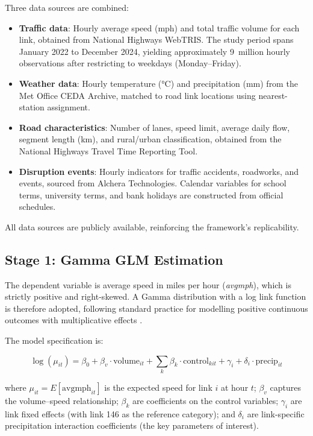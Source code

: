 \documentclass[review]{elsarticle}
\begin{document}
Three data sources are combined:

\begin{itemize}
    \item \textbf{Traffic data}: Hourly average speed (mph) and total traffic volume for each link, obtained from National Highways WebTRIS. The study period spans January 2022 to December 2024, yielding approximately 9~million hourly observations after restricting to weekdays (Monday--Friday).
    \item \textbf{Weather data}: Hourly temperature (\si{\degreeCelsius}) and precipitation (\si{mm}) from the Met Office CEDA Archive, matched to road link locations using nearest-station assignment.
    \item \textbf{Road characteristics}: Number of lanes, speed limit, average daily flow, segment length (km), and rural/urban classification, obtained from the National Highways Travel Time Reporting Tool.
    \item \textbf{Disruption events}: Hourly indicators for traffic accidents, roadworks, and events, sourced from Alchera Technologies. Calendar variables for school terms, university terms, and bank holidays are constructed from official schedules.
\end{itemize}

All data sources are publicly available, reinforcing the framework's replicability.

\subsection{Stage 1: Gamma GLM Estimation}
\label{sec:method:glm}

The dependent variable is average speed in miles per hour (\textit{avgmph}), which is strictly positive and right-skewed. A Gamma distribution with a log link function is therefore adopted, following standard practice for modelling positive continuous outcomes with multiplicative effects \citep{mccullagh1989glm,nelder1972glm}.

The model specification is:

\begin{equation}
\label{eq:glm}
\log(\mu_{it}) = \beta_0 + \beta_v \cdot \text{volume}_{it} + \sum_k \beta_k \cdot \text{control}_{kit} + \gamma_i + \delta_i \cdot \text{precip}_{it}
\end{equation}

\noindent where $\mu_{it} = E[\text{avgmph}_{it}]$ is the expected speed for link $i$ at hour $t$; $\beta_v$ captures the volume--speed relationship; $\beta_k$ are coefficients on the control variables; $\gamma_i$ are link fixed effects (with link 146 as the reference category); and $\delta_i$ are link-specific precipitation interaction coefficients (the key parameters of interest).
\end{document}
